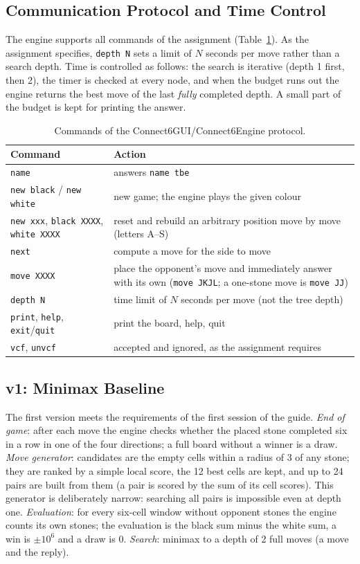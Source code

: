\documentclass[a4paper,10pt,twocolumn]{article}
\newcommand{\code}[1]{\texttt{#1}}
\begin{document}
\subsection{Communication Protocol and Time Control}
The engine supports all commands of the assignment (Table~\ref{tab:protocol}). As the assignment specifies, \code{depth N} sets a limit of $N$ seconds per move rather than a search depth. Time is controlled as follows: the search is iterative (depth 1 first, then 2), the timer is checked at every node, and when the budget runs out the engine returns the best move of the last \emph{fully} completed depth. A small part of the budget is kept for printing the answer.

\begin{table}[t]
\centering
\caption{Commands of the Connect6GUI/\allowbreak{}Connect6Engine protocol.}
\label{tab:protocol}
\begin{tabularx}{\textwidth}{@{}lX@{}}
\toprule
Command & Action \\
\midrule
\code{name} & answers \code{name tbe} \\
\code{new black} / \code{new white} & new game; the engine plays the given colour \\
\code{new xxx}, \code{black XXXX}, \code{white XXXX} & reset and rebuild an arbitrary position move by move (letters A--S) \\
\code{next} & compute a move for the side to move \\
\code{move XXXX} & place the opponent's move and immediately answer with its own (\code{move JKJL}; a one-stone move is \code{move JJ}) \\
\code{depth N} & time limit of $N$ seconds per move (not the tree depth) \\
\code{print}, \code{help}, \code{exit}/\code{quit} & print the board, help, quit \\
\code{vcf}, \code{unvcf} & accepted and ignored, as the assignment requires \\
\bottomrule
\end{tabularx}
\end{table}

\subsection{v1: Minimax Baseline}
The first version meets the requirements of the first session of the guide.
\emph{End of game}: after each move the engine checks whether the placed stone completed six in a row in one of the four directions; a full board without a winner is a draw.
\emph{Move generator}: candidates are the empty cells within a radius of 3 of any stone; they are ranked by a simple local score, the 12 best cells are kept, and up to 24 pairs are built from them (a pair is scored by the sum of its cell scores). This generator is deliberately narrow: searching all pairs is impossible even at depth one.
\emph{Evaluation}: for every six-cell window without opponent stones the engine counts its own stones; the evaluation is the black sum minus the white sum, a win is $\pm10^6$ and a draw is 0.
\emph{Search}: minimax to a depth of 2 full moves (a move and the reply).
\end{document}
